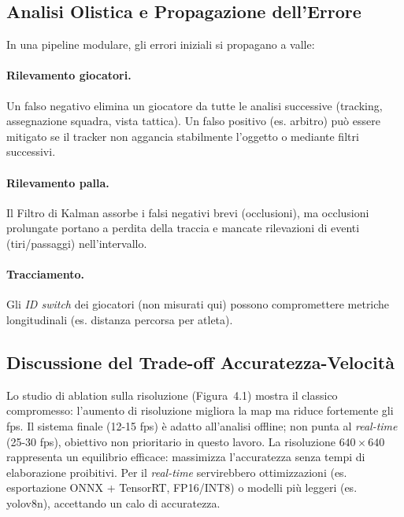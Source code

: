 \documentclass[12pt,a4paper,openright,twoside]{book}
\begin{document}
\subsection{Analisi Olistica e Propagazione dell'Errore}
In una pipeline modulare, gli errori iniziali si propagano a valle:
\paragraph{Rilevamento giocatori.}
Un falso negativo elimina un giocatore da tutte le analisi 
successive (tracking, assegnazione squadra, vista tattica).
Un falso positivo (es. arbitro) può essere mitigato se il 
tracker non aggancia stabilmente l'oggetto o mediante 
filtri successivi.
\paragraph{Rilevamento palla.}
Il Filtro di Kalman assorbe i falsi negativi brevi (occlusioni), 
ma occlusioni prolungate portano a perdita della traccia e 
mancate rilevazioni di eventi (tiri/passaggi) nell'intervallo.
\paragraph{Tracciamento.}
Gli \emph{ID switch} dei giocatori (non misurati qui) 
possono compromettere metriche longitudinali 
(es. distanza percorsa per atleta).

\subsection{Discussione del Trade-off Accuratezza-Velocità}
Lo studio di ablation sulla risoluzione (Figura~4.1) mostra il 
classico compromesso: l'aumento di risoluzione migliora la \ac{map} 
ma riduce fortemente gli \ac{fps}.
Il sistema finale (12-15 \ac{fps}) è adatto all'analisi offline; 
non punta al \emph{real-time} (25-30 \ac{fps}), obiettivo non 
prioritario in questo lavoro.
La risoluzione $640\times640$ rappresenta un equilibrio efficace: 
massimizza l'accuratezza senza tempi di elaborazione proibitivi.
Per il \emph{real-time} servirebbero ottimizzazioni 
(es. esportazione ONNX + TensorRT, FP16/INT8) o modelli più 
leggeri (es. \ac{yolo}v8n), accettando un calo di accuratezza.
\end{document}
